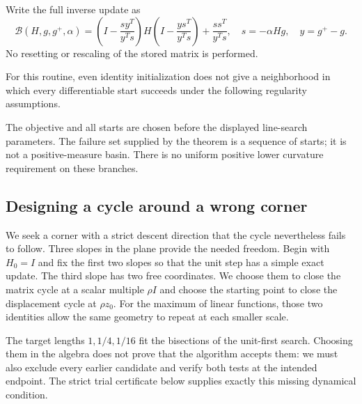 Write the full inverse update as
\begin{equation}\label{art:failure_update}
 \mathcal B(H,g,g^+,\alpha)
 =\left(I-\frac{sy^T}{y^Ts}\right)H
  \left(I-\frac{ys^T}{y^Ts}\right)+\frac{ss^T}{y^Ts},
 \quad s=-\alpha Hg,\quad y=g^+-g.
\end{equation}
No resetting or rescaling of the stored matrix is performed.

For this routine, even identity initialization does not give a neighborhood
in which every differentiable start succeeds under the following regularity
assumptions.


The objective and all starts are chosen before the displayed line-search
parameters. The failure set supplied by the theorem is a sequence of starts;
it is not a positive-measure basin. There is no uniform positive lower
curvature requirement on these branches.

\subsection{Designing a cycle around a wrong corner}
We seek a corner with a strict descent direction that the cycle nevertheless
fails to follow. Three slopes in the plane provide the needed
freedom. Begin with $H_0=I$ and fix the first two slopes so that the unit step
has a simple exact update. The third slope has two free coordinates. We choose
them to close the matrix cycle at a scalar multiple $\rho I$ and choose the
starting point to close the displacement cycle at $\rho z_0$. For the maximum
of linear functions, those two identities allow the same geometry to repeat
at each smaller scale.

The target lengths $1,1/4,1/16$ fit the bisections of the unit-first search.
Choosing them in the algebra does not prove that the algorithm accepts them:
we must also exclude every earlier candidate and verify both tests at the
intended endpoint. The strict trial certificate below supplies exactly this
missing dynamical condition.

